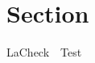\documentclass{article}
\begin{document}
\section{Section} \label{section}

LaCheck~~Test

\end{document}
